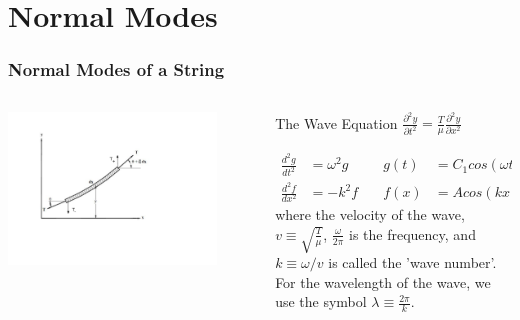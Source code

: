 \documentclass[pdf, handout, hideothersubsections]{beamer}
\begin{document}
\section{Normal Modes}
\begin{frame}
\frametitle{Normal Modes of a String}
\begin{columns}

  \begin{column}{0.4\textwidth}
    \centering
    \includegraphics[width=0.85\textwidth]{StringForceDiagram.pdf}

  \end{column}

  \begin{column}{0.6\textwidth}
\begin{block}{The Wave Equation}
\centering
$ \frac{\partial^2 y}{\partial t^2} = \frac{T}{\mu} \frac{\partial^2 y}{\partial x^2}$
\end{block}
\pause
\begin{alignat}{2}
\frac{d^2 g}{dt^2} &= \omega^2 g  &\quad g(t) &= C_1 cos(\omega t) \\
\frac{d^2 f}{dx^2} &= -k^2 f &\quad f(x) &= A cos(k x) + B
sin(k x) 
\end{alignat}
\pause
where the velocity of the wave, $v \equiv \sqrt{\frac{T}{\mu}}$,
$\frac{\omega}{2 \pi}$ is the frequency, and $k \equiv \omega / v$ is
called the 'wave number'. For the wavelength of the wave, we use the
symbol $\lambda \equiv \frac{2 \pi}{k}$.

  \end{column}

\end{columns}

\end{frame}
\end{document}
